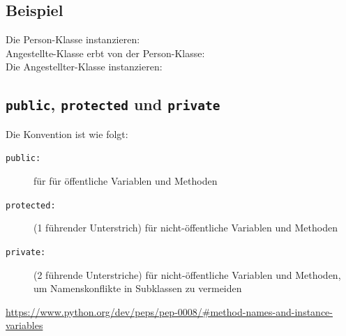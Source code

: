 \subsection{Beispiel}

Die Person-Klasse instanzieren:\\

Angestellte-Klasse erbt von der Person-Klasse:\\

Die Angestellter-Klasse instanzieren:\\


\subsection{\texttt{public}, \texttt{protected} und \texttt{private}}
Die Konvention ist wie folgt:
\begin{description}
	\item[\texttt{public:}] für für öffentliche Variablen und Methoden
	\item[\texttt{protected:}] (1 führender Unterstrich) für nicht-öffentliche Variablen und Methoden
	\item[\texttt{private:}] (2 führende Unterstriche) für nicht-öffentliche Variablen und Methoden, um Namenskonflikte in Subklassen zu vermeiden 
\end{description}
\url{https://www.python.org/dev/peps/pep-0008/#method-names-and-instance-variables}


